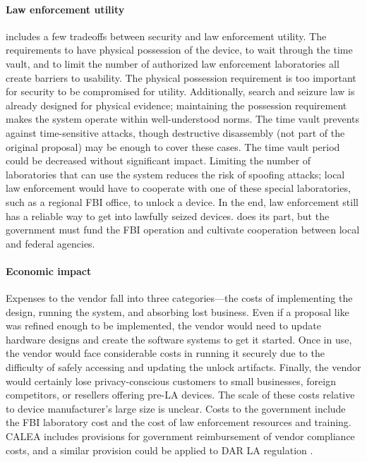 \documentclass[manuscript,screen,review]{acmart}
\begin{document}
\paragraph*{Law enforcement utility} \ldawmsr includes a few tradeoffs between security and law enforcement utility. The
requirements to have physical possession of the device, to wait through the time vault, and to limit the number of
authorized law enforcement laboratories all create barriers to usability. The physical possession requirement is too
important for security to be compromised for utility. Additionally, search and seizure law is already designed for
physical evidence; maintaining the possession requirement makes the system operate within well-understood norms. The
time vault prevents against time-sensitive attacks, though destructive disassembly (not part of the original proposal)
may be enough to cover these cases. The time vault period could be decreased without significant impact. Limiting the
number of laboratories that can use the system reduces the risk of spoofing attacks; local law enforcement would have to
cooperate with one of these special laboratories, such as a regional \ac{FBI} office, to unlock a device. In the end,
law enforcement still has a reliable way to get into lawfully seized devices. \ldawmsr does its part, but the government
must fund the \ac{FBI} operation and cultivate cooperation between local and federal agencies.

\paragraph*{Economic impact} Expenses to the vendor fall into three categories---the costs of implementing the design,
running the system, and absorbing lost business. Even if a proposal like \ldawmsr was refined enough to be implemented,
the vendor would need to update hardware designs and create the software systems to get it started. Once in use, the
vendor would face considerable costs in running it securely due to the difficulty of safely accessing and updating the
unlock artifacts. Finally, the vendor would certainly lose privacy-conscious customers to small businesses, foreign
competitors, or resellers offering pre-\ac{LA} devices. The scale of these costs relative to device manufacturer's large
size is unclear. Costs to the government include the \ac{FBI} laboratory cost and the cost of law enforcement resources
and training. \acs{CALEA} includes provisions for government reimbursement of vendor compliance costs, and a similar
provision could be applied to \ac{DAR} \ac{LA} regulation \cite{edwards_hr4922_1994}.





\end{document}
